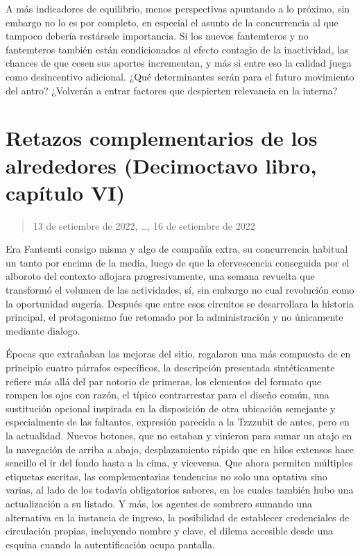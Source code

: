 \documentclass[
]{book}
\begin{document}
A más indicadores de equilibrio, menos perspectivas apuntando a lo próximo, sin embargo no lo es por completo, en especial el asunto de la concurrencia al que tampoco debería restársele importancia. Si los nuevos fantemteros y no fantemteros también están condicionados al efecto contagio de la inactividad, las chances de que cesen sus aportes incrementan, y más si entre eso la calidad juega como desincentivo adicional. ¿Qué determinantes serán para el futuro movimiento del antro? ¿Volverán a entrar factores que despierten relevancia en la interna?

\hypertarget{retazos-complementarios-de-los-alrededores-decimoctavo-libro-capuxedtulo-vi}{%
\section{Retazos complementarios de los alrededores (Decimoctavo libro, capítulo VI)}\label{retazos-complementarios-de-los-alrededores-decimoctavo-libro-capuxedtulo-vi}}

\begin{quote}
13 de setiembre de 2022, \ldots, 16 de setiembre de 2022
\end{quote}

Era Fantemti consigo misma y algo de compañía extra, su concurrencia habitual un tanto por encima de la media, luego de que la efervescencia conseguida por el alboroto del contexto aflojara progresivamente, una semana revuelta que transformó el volumen de las actividades, sí, sin embargo no cual revolución como la oportunidad sugería. Después que entre esos circuitos se desarrollara la historia principal, el protagonismo fue retomado por la administración y no únicamente mediante dialogo.

Épocas que extrañaban las mejoras del sitio, regalaron una más compuesta de en principio cuatro párrafos específicos, la descripción presentada sintéticamente refiere más allá del par notorio de primeras, los elementos del formato que rompen los ojos con razón, el típico contrarrestar para el diseño común, una sustitución opcional inspirada en la disposición de otra ubicación semejante y especialmente de las faltantes, expresión parecida a la Tzzzubit de antes, pero en la actualidad. Nuevos botones, que no estaban y vinieron para sumar un atajo en la navegación de arriba a abajo, desplazamiento rápido que en hilos extensos hace sencillo el ir del fondo hasta a la cima, y viceversa. Que ahora permiten múltiples etiquetas escritas, las complementarias tendencias no solo una optativa sino varias, al lado de los todavía obligatorios sabores, en los cuales también hubo una actualización a su listado. Y más, los agentes de sombrero sumando una alternativa en la instancia de ingreso, la posibilidad de establecer credenciales de circulación propias, incluyendo nombre y clave, el dilema accesible desde una esquina cuando la autentificación ocupa pantalla.
\end{document}
